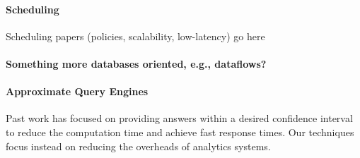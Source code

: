
\paragraph {\bf Scheduling} Scheduling papers (policies, scalability, low-latency) go here~\cite{Sparrow}


\paragraph {\bf Something more databases oriented, e.g., dataflows?}

\paragraph {\bf Approximate Query Engines} Past work \cite{BlinkDB, OnlineAggregation} has focused on providing answers within a desired confidence interval to reduce the computation time and achieve fast response times. Our techniques focus instead on reducing the overheads of analytics systems.


